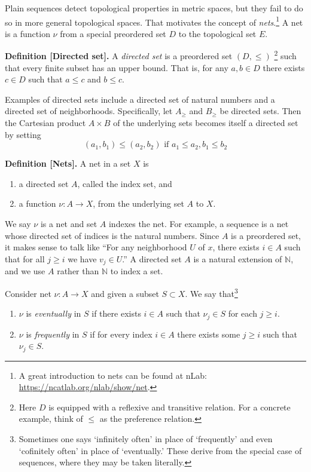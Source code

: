 Plain sequences detect topological properties in metric spaces, but they fail to do so in more general topological spaces.
That motivates the concept of \textit{nets}.\footnote{A great introduction to nets can be found at nLab: \url{https://ncatlab.org/nlab/show/net}.}
A net is a function $\nu$ from a special preordered set $D$ to the topological set $E$.


\noindent \textbf{Definition [Directed set].}
A \textit{directed set} is a preordered set $(D, \le)$
\footnote{Here $D$ is equipped with a reflexive and transitive relation. For a  concrete example, think of $\le$ as the preference relation.}
such that every finite subset has an upper bound. That is,  for any
$a,b \in D$ there exists $c \in D$ 
such that $a \le c$ and $b \le c$.

Examples of directed sets include 
a directed set of natural numbers and a directed set of neighborhoods.
Specifically, let $A_{\ge}$ and  $B_{\ge}$ be directed sets.
Then the Cartesian product $A \times B$ of the underlying sets becomes itself a directed set by setting
$$
(a_1, b_1) \leq (a_2, b_2) \text{ if } a_1 \le a_2, b_1 \le b_2
$$


\noindent \textbf{Definition [Nets].}
A net in a set $X$ is
\begin{enumerate}
  \item  a directed set $A$, called the index set, and
  \item  a function $\nu \colon A \to X$, from the underlying set $A$ to $X$.
\end{enumerate}
We say $\nu$ is a net and set $A$ indexes the net.
For example, a sequence is a net whose directed set of indices is the natural numbers. 
Since $A$ is a preordered set, it makes sense to talk like ``For any neighborhood $U$ of $x$, there exists $i \in A$ such that for all $j \ge i$ we have $v_j \in U$.''
A directed set $A$ is a natural extension of $\mathbb N$, 
and we use $A$ rather than $\mathbb N$ to index a set.


Consider net $\nu: A \to X$ and given a subset $S \subset X$. We say that\footnote{Sometimes one says `infinitely often' in place of `frequently' and even `cofinitely often' in place of `eventually.'
These derive from the special case of sequences, where they may be taken literally.}
\begin{enumerate}
  \item $\nu$ is \textit{eventually} in $S$ if there exists $i \in A$ such that $\nu_j \in S$ for each $j \ge i$.
  \item $\nu$ is \textit{frequently} in $S$ if for every index    $i \in A$ there exists some $j \ge i$ such that $\nu_j \in S$.
\end{enumerate}

